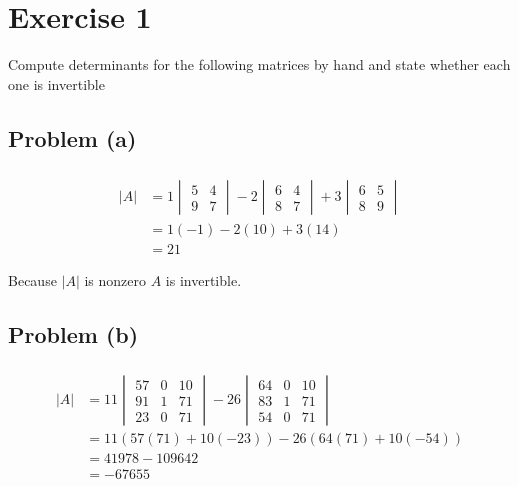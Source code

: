 \documentclass[11pt]{article}
\begin{document}
\thispagestyle{empty}

\newlength{\boxlength}\setlength{\boxlength}{\textwidth}
\addtolength{\boxlength}{-4mm}

\begin{center}
\end{center}




\section*{Exercise 1}

Compute determinants for the following matrices by hand and state whether each one is invertible

\subsection*{Problem (a)}

\subparagraph*{}

\begin{align*}
	|A| &= 1 \begin{vmatrix} 5 & 4 \\ 9 & 7 \end{vmatrix} - 2 \begin{vmatrix} 6 & 4 \\ 8 & 7 \end{vmatrix} + 3 \begin{vmatrix} 6 & 5 \\ 8 & 9 \end{vmatrix} \\
	&= 1(-1) - 2(10) + 3(14) \\
	&= 21
\end{align*}

Because $|A|$ is nonzero $A$ is invertible.

\subsection*{Problem (b)}

\subparagraph*{}

\begin{align*}
	|A| &= 11 \begin{vmatrix} 57 & 0 & 10 \\ 91 & 1 & 71 \\ 23 & 0 & 71 \end{vmatrix} - 26 \begin{vmatrix} 64 & 0 & 10 \\ 83 & 1 & 71 \\ 54 & 0 & 71 \end{vmatrix} \\
	&= 11(57(71) + 10(-23)) - 26(64(71)+10(-54)) \\
	&= 41978 - 109642 \\
	&= -67655
\end{align*}
\end{document}
